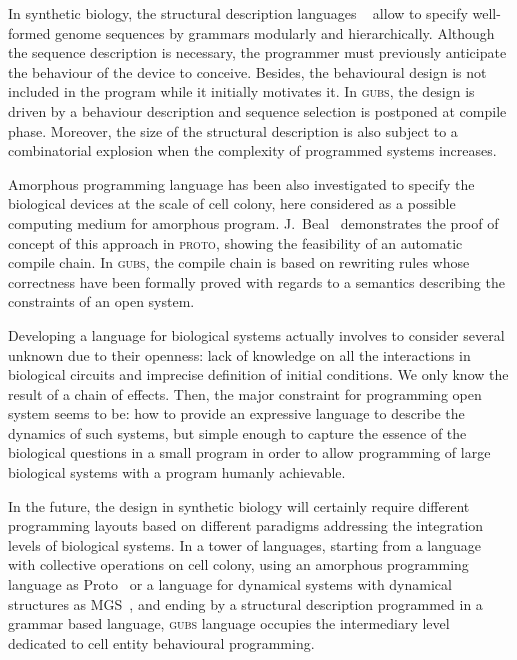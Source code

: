 \documentclass{eptcs}
\newcounter{ti}
\begin{document}
In synthetic biology, the structural description languages ~\cite{Czar2009,Pedersen2009a,Bilitchenko2011} allow to specify 
 well-formed genome sequences by grammars modularly and hierarchically. Although the sequence description is necessary, the programmer must previously anticipate the behaviour of the device to conceive. Besides, the behavioural design is not included in the program while it initially motivates it. In \textsc{gubs}, the design is driven by a behaviour description and sequence selection is postponed at compile phase. Moreover, the size of the structural description is also subject to a combinatorial explosion when the complexity of programmed systems increases.

Amorphous programming language has been also investigated to specify the biological devices at the scale of cell colony, here considered as a possible computing medium for amorphous program. J.~Beal~\cite{Beal2011} demonstrates the proof of concept of this approach in \textsc{proto}, showing the feasibility of an automatic compile chain. In \textsc{gubs}, the compile chain is based on rewriting rules whose correctness have been formally proved with regards to a semantics describing the constraints of an open system.

Developing a language for biological systems actually involves to consider several unknown due to their openness: lack of knowledge on all the interactions in biological circuits and imprecise definition of initial conditions. We only know the result of a chain of effects. Then, the major constraint for programming open system seems to be: how to provide an expressive language to describe the dynamics of such systems, but simple enough to capture the essence of the biological questions in a small program in order to allow programming of large biological systems with a program humanly achievable.

In the future, the design in synthetic biology will certainly require different programming layouts based on different paradigms addressing the integration levels of biological systems. In a tower of languages, starting from a language with collective operations on cell colony, using an amorphous programming language as Proto~\cite{Beal2011} or a language for dynamical systems with dynamical structures as MGS~\cite{Spicher2005}, and ending by a structural description programmed in a grammar based language, \textsc{gubs} language occupies the intermediary level dedicated to cell entity behavioural programming. 
\end{document}
